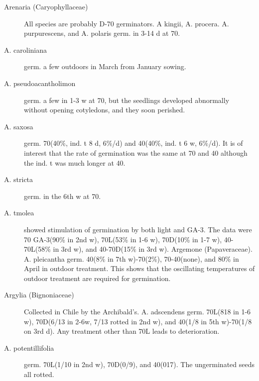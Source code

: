 \begin{description}
\item[Arenaria (Caryophyllaceae)] All species are probably D-70 germinators.
A kingii, A. procera. A. purpurescens, and A. polaris germ. in 3-14 d at 70.
\item[A. caroliniana] germ. a few outdoors in March from January sowing.
\item[A. pseudoacantholimon] germ. a few in 1-3 w at 70, but the seedlings developed
abnormally without opening cotyledons, and they soon perished.
\item[A. saxosa] germ. 70(40\%, ind. t 8 d, 6\%/d) and 40(40\%, ind. t 6 w, 6\%/d). It is of
interest that the rate of germination was the same at 70 and 40 although the ind. t was
much longer at 40.
\item[A. stricta] germ. in the 6th w at 70.
\item[A. tmolea] showed stimulation of germination by both light and GA-3. The data
were 70 GA-3(90\% in 2nd w), 70L(53\% in 1-6 w), 70D(10\% in 1-7 w), 40-70L(58\% in
3rd w), and 40-70D(15\% in 3rd w).
Argemone (Papaveraceae). A. pleicantha germ. 40(8\% in 7th w)-70(2\%),
70-40(none), and 80\% in April in outdoor treatment. This shows that the oscillating
temperatures of outdoor treatment are required for germination.

\item[Argylia (Bignoniaceae)] Collected in Chile by the Archibald's.
A. adscendens germ. 70L(818 in 1-6 w), 70D(6/13 in 2-6w, 7/13 rotted in 2nd
w), and 40(1/8 in 5th w)-70(1/8 on 3rd d). Any treatment other than 70L leads to
deterioration.
\item[A. potentillifolia] germ. 70L(1/10 in 2nd w), 70D(0/9), and 40(017). The
ungerminated seeds all rotted.


\end{description}
